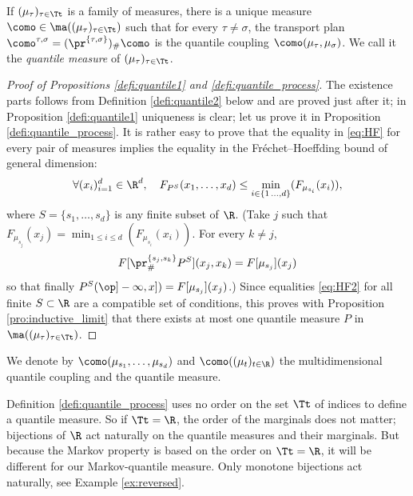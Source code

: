\begin{prodefinition}\label{defi:quantile_process}If $(\mu_\tau)_{\tau\in\Tt}$ is a family of measures, there is a unique measure $\como\in \ma((\mu_{\tau})_{\tau\in\Tt})$ such that for every $\tau\neq\sigma$, the transport plan $\como^{\tau,\sigma}=(\pr^{\{\tau,\sigma\}})_\#\como$ is the quantile coupling $\como(\mu_\tau,\mu_\sigma)$. We call it the \emph{quantile measure} of $(\mu_\tau)_{\tau\in\Tt}$.
\end{prodefinition}

\begin{proof}[Proof of Propositions \ref{defi:quantile1} and \ref{defi:quantile_process}] The existence parts follows from Definition \ref{defi:quantile2} below and are proved just after it; in Proposition \ref{defi:quantile1} uniqueness is clear; let us prove it in Proposition \ref{defi:quantile_process}. It is rather easy to prove that the equality in \eqref{eq:HF} for every pair of measures implies the equality in the Fréchet--Hoeffding bound of general dimension:
\begin{align}\label{eq:HF2}
\forall(x_i)_{i=1}^d\in\R^d,\quad F_{P^S}(x_1,\ldots,x_d)\leq \min_{i\in\{1\,\ldots,d\}}(F_{\mu_{s_i}}(x_i)),
\end{align}
where $S=\{s_1,\ldots,s_d\}$ is any finite subset of $\R$. (Take $j$ such that $F_{\mu_{s_j}}(x_j)=\min_{1\leq i\leq d}(F_{\mu_{s_i}}(x_i))$. For every $k\neq j$,
\[
F[\pr^{\{s_j,s_k\}}_\#P^S](x_j,x_k)=F[\mu_{s_j}](x_j)
\]
so that finally $P^S(\op]-\infty,x])=F[\mu_{s_j}](x_j)$.) Since equalities \eqref{eq:HF2} for all finite $S\subset\R$ are a compatible set of conditions, this proves with Proposition \ref{pro:inductive_limit} that there exists at most one quantile measure $P$ in $\ma((\mu_\tau)_{\tau\in\Tt})$.
\end{proof}

\begin{notation}\label{not:multi} We denote by $\como(\mu_{s_1},\ldots,\mu_{s_d})$ and $\como((\mu_t)_{t\in \R})$ the multidimensional quantile coupling and the quantile measure.
\end{notation}

\begin{rem}
Definition \ref{defi:quantile_process} uses no order on the set $\Tt$ of indices to define a quantile measure. So if $\Tt=\R$, the order of the marginals does not matter; bijections of $\R$ act naturally on the quantile measures and their marginals. But because the Markov property is based on the order on $\Tt=\R$, it will be different for our Markov-quantile measure. Only monotone bijections act naturally, see Example \ref{ex:reversed}.
\end{rem}

